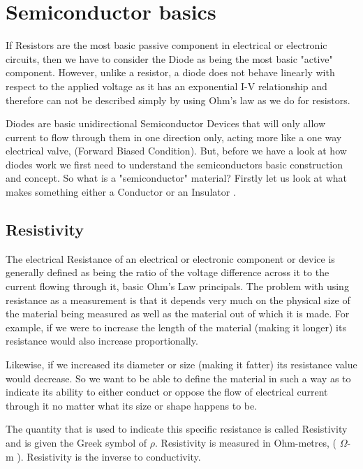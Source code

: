 \documentclass[main]{subfiles}
\begin{document}
\section{Semiconductor basics}

If Resistors are the most basic passive component in electrical or electronic circuits, then we have to consider the Diode as being the most basic "active" component. However, unlike a resistor, a diode does not behave linearly with respect to the applied voltage as it has an exponential I-V relationship and therefore can not be described simply by using Ohm’s law as we do for resistors.

Diodes are basic unidirectional Semiconductor Devices that will only allow current to flow through them in one direction only, acting more like a one way electrical valve, (Forward Biased Condition). But, before we have a look at how diodes work we first need to understand the semiconductors basic construction and concept. So what is a "semiconductor" material? Firstly let us look at what makes something either a Conductor or an Insulator \cite{diode-basics}.

\subsection{Resistivity}
The electrical Resistance of an electrical or electronic component or device is generally defined as being the ratio of the voltage difference across it to the current flowing through it, basic Ohm's Law principals. The problem with using resistance as a measurement is that it depends very much on the physical size of the material being measured as well as the material out of which it is made. For example, if we were to increase the length of the material (making it longer) its resistance would also increase proportionally.

Likewise, if we increased its diameter or size (making it fatter) its resistance value would decrease. So we want to be able to define the material in such a way as to indicate its ability to either conduct or oppose the flow of electrical current through it no matter what its size or shape happens to be.

The quantity that is used to indicate this specific resistance is called Resistivity and is given the Greek symbol of $\rho$. Resistivity is measured in Ohm-metres, ( $\Omega$-m ). Resistivity is the inverse to conductivity.
\end{document}
